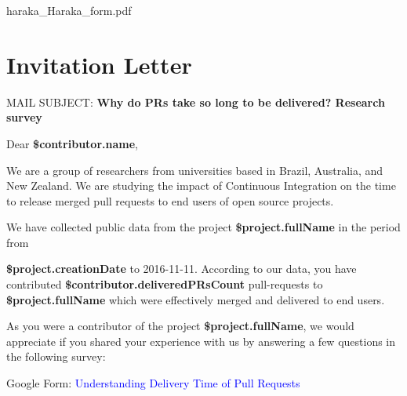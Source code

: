 	
	\appendixtitleon
	\appendixtitletocon
	\begin{appendices}

		
		
	
		{haraka_Haraka_form.pdf}	
	
	\section{Invitation Letter}
	\label{sec:appendix_invitation_latter}
	
	{\selectfont

	\noindent
	MAIL SUBJECT: \textbf{Why do PRs take so long to be delivered? Research survey}
	\vspace{0.3cm} 
	
	\noindent
	Dear \textbf{\${contributor.name}},	
	\vspace{0.3cm} 

	\noindent
	We are a group of researchers from universities based in Brazil, Australia, and New Zealand. We are studying the impact of Continuous Integration on the time to release merged pull requests to end users of open source projects.
	\vspace{0.3cm} 
	
	\noindent
	We have collected public data from the project \textbf{\${project.fullName}} in the period from 
	
	\noindent
	\textbf{\${project.creationDate}} to 2016-11-11. According to our data, you have contributed \textbf{\${contributor.deliveredPRsCount}} pull-requests to \textbf{\${project.fullName}} which were effectively merged and delivered to end users. 
	\vspace{0.3cm} 
	
	\noindent
	As you were a contributor of the project \textbf{\${project.fullName}}, we would appreciate if you shared your experience with us by answering a few questions in the following survey: 
	\vspace{0.3cm} 
	
	\noindent
	Google Form: \textcolor{blue}{Understanding Delivery Time of Pull Requests}
	\vspace{0.3cm} 
	
}
\end{appendices}
